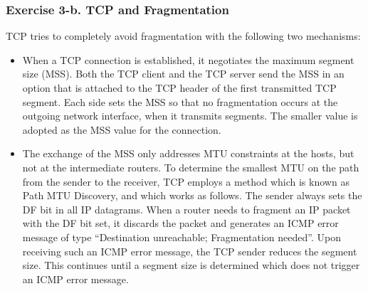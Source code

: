 \subsubsection{Exercise 3-b. TCP and Fragmentation}

TCP tries to completely avoid fragmentation with the following two mechanisms:

\begin{itemize}
	\item When a TCP connection is established, it negotiates the maximum segment size (MSS). Both the TCP client and the TCP server send the MSS in an option that is attached to the TCP header of the first transmitted TCP segment. Each side sets the MSS so that no fragmentation occurs at the outgoing network interface, when it transmits segments. The smaller value is adopted as the MSS value for the connection.
	\item The exchange of the MSS only addresses MTU constraints at the hosts, but not at the intermediate routers. To determine the smallest MTU on the path from the sender to the receiver, TCP employs a method which is known as Path MTU Discovery, and which works as follows. The sender always sets the DF bit in all IP datagrams. When a router needs to fragment an IP packet with the DF bit set, it discards the packet and generates an ICMP error message of type “Destination unreachable; Fragmentation needed”. Upon receiving such an ICMP error message, the TCP sender reduces the segment size. This continues until a segment size is determined which does not trigger an ICMP error message.
\end{itemize}

